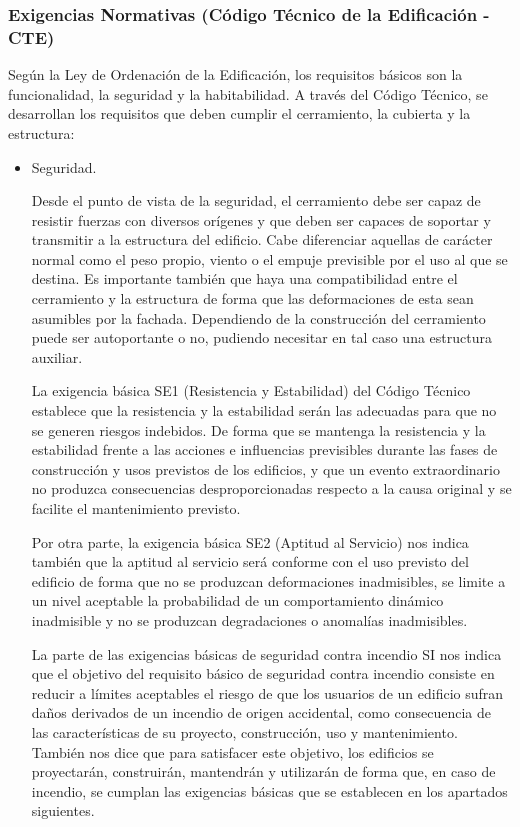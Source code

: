 \subsubsection*{Exigencias Normativas (Código Técnico de la Edificación - CTE)}

Según la Ley de Ordenación de la Edificación, los requisitos básicos son la funcionalidad, la seguridad y la habitabilidad. A través del Código Técnico, se desarrollan los requisitos que deben cumplir el cerramiento, la cubierta y la estructura:

\begin{itemize}
    \item Seguridad.
    
Desde el punto de vista de la seguridad, el cerramiento debe ser capaz de resistir fuerzas con diversos orígenes y que deben ser capaces de soportar y transmitir a la estructura del edificio. Cabe diferenciar aquellas de carácter normal como el peso propio, viento o el empuje previsible por el uso al que se destina. Es importante también que haya una compatibilidad entre el cerramiento y la estructura de forma que las deformaciones de esta sean asumibles por la fachada. Dependiendo de la construcción del cerramiento puede ser autoportante o no, pudiendo necesitar en tal caso una estructura auxiliar.  

La exigencia básica SE1 (Resistencia y Estabilidad) del Código Técnico establece que la resistencia y la estabilidad serán las adecuadas para que no se generen riesgos indebidos. De forma que se mantenga la resistencia y la estabilidad frente a las acciones e influencias previsibles durante las fases de construcción y usos previstos de los edificios, y que un evento extraordinario no produzca consecuencias desproporcionadas respecto a la causa original y se facilite el mantenimiento previsto.

Por otra parte, la exigencia básica SE2 (Aptitud al Servicio) nos indica también que la aptitud al servicio será conforme con el uso previsto del edificio de forma que no se produzcan deformaciones inadmisibles, se limite a un nivel aceptable la probabilidad de un comportamiento dinámico inadmisible y no se produzcan degradaciones o anomalías inadmisibles.

La parte de las exigencias básicas de seguridad contra incendio SI nos indica que el objetivo del requisito básico de seguridad contra incendio consiste en reducir a límites aceptables el riesgo de que los usuarios de un edificio sufran daños derivados de un incendio de origen accidental, como consecuencia de las características de su proyecto, construcción, uso y mantenimiento. También nos dice que para satisfacer este objetivo, los edificios se proyectarán, construirán, mantendrán y utilizarán de forma que, en caso de incendio, se cumplan las exigencias básicas que se establecen en los apartados siguientes.


\end{itemize}
